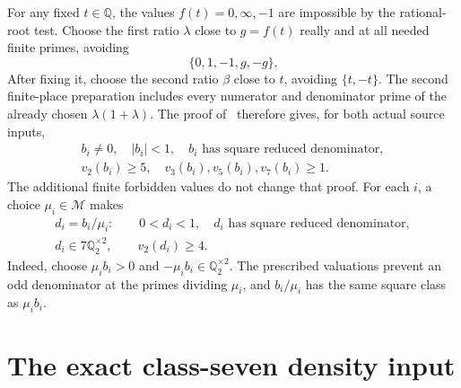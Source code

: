 \documentclass[11pt,a4paper]{article}
\newcommand{\Q}{\mathbb Q}\newcommand{\Z}{\mathbb Z}
\begin{document}
For any fixed \(t\in\Q\), the values \(f(t)=0,\infty,-1\) are impossible
by the rational-root test. Choose the first ratio \(\lambda\) close
to \(g=f(t)\) really and at all needed finite primes, avoiding
\[
                       \{0,1,-1,g,-g\}.
\]
After fixing it, choose the second ratio \(\beta\) close to \(t\),
avoiding \(\{t,-t\}\). The second finite-place preparation includes
every numerator and denominator prime of the already chosen
\(\lambda(1+\lambda)\). The proof of~\cite{amplified} therefore gives,
for both actual source inputs,
\begin{equation}\label{eq:preparedb}
 \begin{gathered}
 b_i\ne0,\quad |b_i|<1,\quad b_i\text{ has square reduced denominator},\\
 v_2(b_i)\ge5,\quad v_3(b_i),v_5(b_i),v_7(b_i)\ge1.
 \end{gathered}
\end{equation}
The additional finite forbidden values do not change that proof.
For each \(i\), a choice \(\mu_i\in\mathcal M\) makes
\begin{equation}\label{eq:preparedd}
 \begin{gathered}
 d_i=b_i/\mu_i:\qquad 0<d_i<1,\quad
 d_i\text{ has square reduced denominator},\\
 d_i\in7\Q_2^{\times2},\qquad v_2(d_i)\ge4.
 \end{gathered}
\end{equation}
Indeed, choose \(\mu_i b_i>0\) and \(-\mu_i b_i\in\Q_2^{\times2}\).
The prescribed valuations prevent an odd denominator at the primes
dividing \(\mu_i\), and \(b_i/\mu_i\) has the same square class as
\(\mu_i b_i\).

\section{The exact class-seven density input}\label{sec:density}
\end{document}
